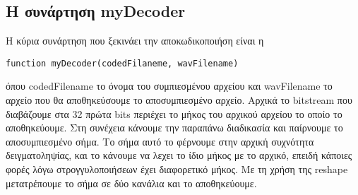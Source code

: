 \subsection{Η συνάρτηση myDecoder}
\par Η κύρια συνάρτηση που ξεκινάει την αποκωδικοποιήση είναι η 
\begin{lstlisting}[style=MyMatlab]
 function myDecoder(codedFilaneme, wavFilename) 
\end{lstlisting}
όπου codedFilename το όνομα του συμπιεσμένου αρχείου και wavFilename το αρχείο που θα 
αποθηκεύσουμε το αποσυμπιεσμένο αρχείο. Αρχικά το bitstream που διαβάζουμε στα 32 πρώτα 
bits περιέχει το μήκος του αρχικού αρχείου το οποίο το αποθηκεύουμε. Στη συνέχεια κάνουμε 
την παραπάνω διαδικασία και παίρνουμε το αποσυμπιεσμένο σήμα. Το σήμα αυτό το 
φέρνουμε στην αρχική συχνότητα δειγματοληψίας, και το κάνουμε να λεχει το ίδιο μήκος 
με το αρχικό, επειδή κάποιες φορές λόγω στρογγυλοποιήσεων έχει διαφορετικό μήκος. 
Με τη χρήση της reshape μετατρέπουμε το σήμα σε δύο κανάλια και το αποθηκεύουμε.

